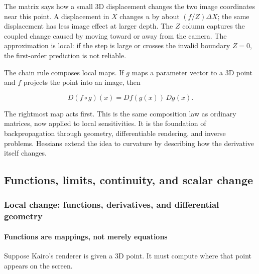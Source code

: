 The matrix says how a small 3D displacement changes the two image coordinates near this point. A displacement in \(X\) changes \(u\) by about \((f/Z)\Delta X\); the same displacement has less image effect at larger depth. The \(Z\) column captures the coupled change caused by moving toward or away from the camera. The approximation is local: if the step is large or crosses the invalid boundary \(Z=0\), the first-order prediction is not reliable.

The chain rule composes local maps. If \(g\) maps a parameter vector to a 3D point and \(f\) projects the point into an image, then

\[
D(f\circ g)(x)=Df(g(x))\,Dg(x).
\]

The rightmost map acts first. This is the same composition law as ordinary matrices, now applied to local sensitivities. It is the foundation of backpropagation through geometry, differentiable rendering, and inverse problems. Hessians extend the idea to curvature by describing how the derivative itself changes.

\subsection{Functions, limits, continuity, and scalar change}\label{01-foundations-i-ch020-functions-limits-continuity-and-scalar-change}

\hypertarget{01-foundations-i-ch020-functions-limits-continuity-and-scalar-change}{}

\subsubsection{Local change: functions, derivatives, and differential geometry}\label{01-foundations-i-ch020-local-change-functions-derivatives-and-differential-geometry}

\hypertarget{01-foundations-i-ch020-local-change-functions-derivatives-and-differential-geometry}{}

\paragraph{Functions are mappings, not merely equations}\label{01-foundations-i-ch020-functions-are-mappings-not-merely-equations}

\hypertarget{01-foundations-i-ch020-functions-are-mappings-not-merely-equations}{}

Suppose Kairo's renderer is given a 3D point. It must compute where that point appears on the screen.

